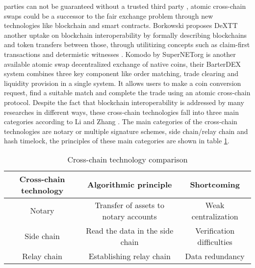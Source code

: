 parties can not be guaranteed without a trusted third party \cite{pagnia1999impossibility}, atomic cross-chain swaps could be a successor to the fair exchange problem through new technologies like blockchain and smart contracts. Borkowski proposes \ac{DeXTT} another uptake on blockchain interoperability by formally describing blockchains and token transfers between those, through utilitizing concepts such as claim-first transactions and determistic witnesses \cite{borkowski2019dextt}. Komodo \cite{barterdex2020} by SuperNETorg is another available atomic swap decentralized exchange of native coins, their BarterDEX system combines three key component like order matching, trade clearing and liquidity provision in a single system. It allows users to make a coin conversion request, find a suitable match and complete the trade using an atomic cross-chain protocol. Despite the fact that blockchain interoperability is addressed by many researches in different ways, these cross-chain technologies fall into three main categories according to Li and Zhang \cite{zheng2020blockchain}. The main categories of the cross-chain technologies are notary or multiple signature schemes, side chain/relay chain and hash timelock, the principles of these main categories are shown in table \ref{table:1}. \newline

\begin{table}[h!]
	\centering
	\begin{tabular}{|c | c | c |} 
		\hline 
		Cross-chain technology & Algorithmic principle & Shortcoming \\ [0.5ex] 
		\hline \hline
		Notary & Transfer of assets to notary accounts & Weak centralization  \\ 
		\hline
		Side chain & Read the data in the side chain & Verification difficulties  \\
		\hline
		Relay chain & Establishing relay chain & Data redundancy  \\ [1ex] 
		\hline
	\end{tabular}
	\caption{Cross-chain technology comparison}
	\label{table:1}
\end{table}

